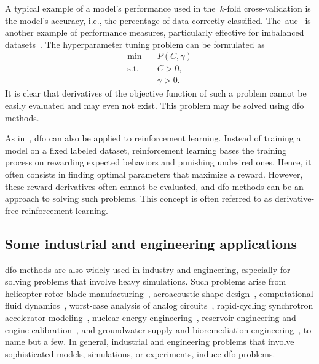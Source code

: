 A typical example of a model's performance used in the~$k$-fold cross-validation is the model's accuracy, i.e., the percentage of data correctly classified.
The~\gls{auc}~\cite{Hanley_Mcneil_1982} is another example of performance measures, particularly effective for imbalanced datasets~\cite{Bradley_1997}.
The hyperparameter tuning problem can be formulated as
\begin{equation*}
    \begin{aligned}
        \min        & \quad P(C, \gamma)\\
        \text{s.t.} & \quad C > 0,\\
                    & \quad \gamma > 0.
    \end{aligned}
\end{equation*}
It is clear that derivatives of the objective function of such a problem cannot be easily evaluated and may even not exist.
This problem may be solved using \gls{dfo} methods.

As in~\cite{Qian_Yu_2021}, \gls{dfo} can also be applied to reinforcement learning.
Instead of training a model on a fixed labeled dataset, reinforcement learning bases the training process on rewarding expected behaviors and punishing undesired ones.
Hence, it often consists in finding optimal parameters that maximize a reward.
However, these reward derivatives often cannot be evaluated, and \gls{dfo} methods can be an approach to solving such problems.
This concept is often referred to as derivative-free reinforcement learning.


\subsection{Some industrial and engineering applications}

\Gls{dfo} methods are also widely used in industry and engineering, especially for solving problems that involve heavy simulations.
Such problems arise from helicopter rotor blade manufacturing~\cite{Booker_Etal_1998a,Booker_Etal_1998b,Serafini_1998}, aeroacoustic shape design~\cite{Marsden_2004,Marsden_Etal_2004}, computational fluid dynamics~\cite{Duvigneau_Visonneau_2004}, worst-case analysis of analog circuits~\cite{Latorre_Etal_2019}, rapid-cycling synchrotron accelerator modeling~\cite{Eldred_Etal_2021}, nuclear energy engineering~\cite{Kortelainen_Etal_2010,Kortelainen_Etal_2012,Kortelainen_Etal_2014}, reservoir engineering and engine calibration~\cite{Langouet_2011}, and groundwater supply and bioremediation engineering~\cite{Fowler_Etal_2008,Mugunthan_Shoemaker_Regis_2005,Yoon_Shoemaker_1999}, to name but a few.
In general, industrial and engineering problems that involve sophisticated models, simulations, or experiments, induce \gls{dfo} problems.

